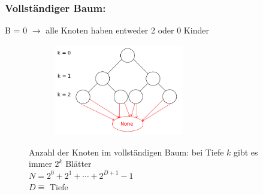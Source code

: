 \subsubsection{Vollständiger Baum:}
B = 0 $\rightarrow$ alle Knoten haben entweder 2 oder 0 Kinder

\begin{figure}[htbp]
    \begin{minipage}[t]{8cm}
        \vspace{0pt}
            \centering
             \includegraphics[width=8cm,height=4cm,keepaspectratio]{./Pictures/vollstBaum.png}
    \end{minipage}
    \begin{minipage}[t]{6cm}
        \vspace{1cm}
        Anzahl der Knoten im vollständigen Baum: bei Tiefe $k$ gibt es immer $2^k$ Blätter \\
        \hspace*{1cm} $N = 2^0 + 2^1 + \cdots + 2^{D+1} -1$ \\
        \hspace*{1cm} $D \widehat{=}$ Tiefe
    \end{minipage}
\end{figure}


